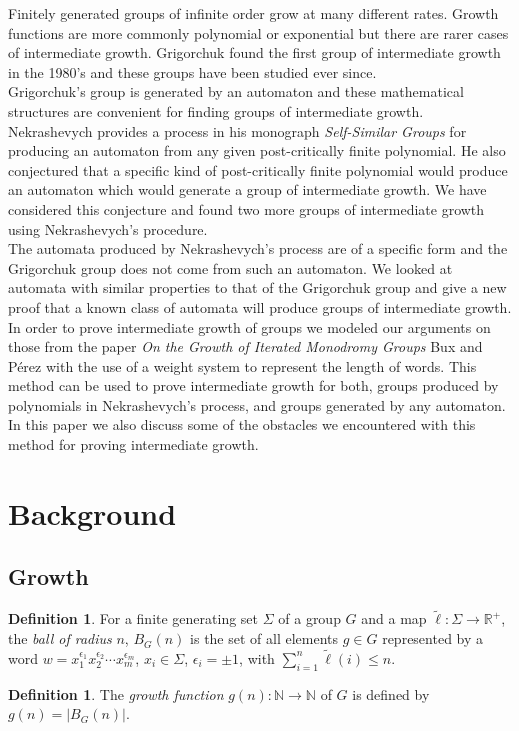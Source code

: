 \documentclass[11pt]{amsart}
\theoremstyle{definition}
\newtheorem{definition}[theorem]{Definition}
\theoremstyle{remark}
\numberwithin{equation}{section}
\begin{document}
\indent Finitely generated groups of infinite order grow at many different rates. Growth functions are more commonly polynomial or exponential but there are rarer cases of intermediate growth. Grigorchuk found the first group of intermediate growth in the 1980's and these groups have been studied ever since.\\
\indent Grigorchuk's group is generated by an automaton and these mathematical structures are convenient for finding groups of intermediate growth. Nekrashevych provides a process in his monograph \textit{Self-Similar Groups} for producing an automaton from any given post-critically finite polynomial. He also conjectured that a specific kind of post-critically finite polynomial would produce an automaton which would generate a group of intermediate growth. We have considered this conjecture and found two more groups of intermediate growth using Nekrashevych's procedure.\\
\indent The automata produced by Nekrashevych's process are of a specific form and the Grigorchuk group does not come from such an automaton. We looked at automata with similar properties to that of the Grigorchuk group and give a new proof that a known class of automata will produce groups of intermediate growth.\\
\indent In order to prove intermediate growth of groups we modeled our arguments on those from the paper \textit{On the Growth of Iterated Monodromy Groups} Bux and P\'{e}rez \cite{BuxP} with the use of a weight system to represent the length of words. This method can be used to prove intermediate growth for both, groups produced by polynomials in Nekrashevych's process, and groups generated by any automaton. In this paper we also discuss some of the obstacles we encountered with this method for proving intermediate growth.
\newpage

\section{Background}

\subsection{Growth}

\begin{definition} 
\indent For a finite generating set $\Sigma$ of a group $G$ and a map $\tilde{\ell}: \Sigma\to \mathbb{R}^+$, the \textit{ball of radius} $\mathit{n}$, $B_G(n)$ is the set of all elements $g\in G$ represented by a word $w=x_1^{\epsilon_1}x_2^{\epsilon_2}\cdots x_m^{\epsilon_m}$, $x_i\in \Sigma$, $\epsilon_i=\pm 1$, with $\displaystyle \sum_{i=1}^n\tilde{\ell}(i)\leq n$.\end{definition}
\begin{definition}
\indent The \textit{growth function} $g(n): \mathbb{N}\to \mathbb{N}$ of $G$ is defined by $g(n)=|B_G(n)|$.\\
\end{definition}
\end{document}
